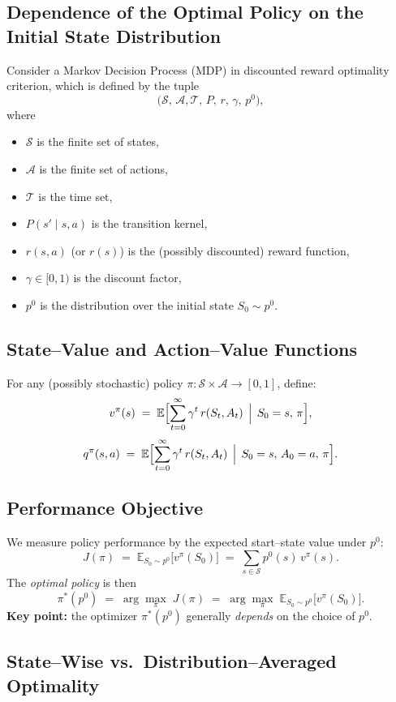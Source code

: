 \subsection{Dependence of the Optimal Policy on the Initial State Distribution}

Consider a Markov Decision Process (MDP) in discounted reward optimality criterion, which is defined by the tuple
\[
\bigl(\mathcal{S},\,\mathcal{A}, \mathcal{T}, \,P,\,r,\,\gamma,\,p^0\bigr),
\]
where
\begin{itemize}
  \item $\mathcal{S}$ is the finite set of states,
  \item $\mathcal{A}$ is the finite set of actions,
  \item $\mathcal{T}$ is the time set,
  \item $P(s' \mid s,a)$ is the transition kernel,
  \item $r(s,a)$ (or $r(s)$) is the (possibly discounted) reward function,
  \item $\gamma\in[0,1)$ is the discount factor,
  \item $p^0$ is the distribution over the initial state $S_0\sim p^0$.
\end{itemize}

\subsection{State–Value and Action–Value Functions}
For any (possibly stochastic) policy $\pi:\mathcal{S}\times\mathcal{A}\to[0,1]$, define:
\[
v^\pi(s) \;=\; \mathbb{E}\Bigl[\sum_{t=0}^\infty \gamma^t\,r(S_t,A_t)\,\Bigm|\,S_0=s,\,\pi\Bigr],
\]
\[
q^\pi(s,a) \;=\; \mathbb{E}\Bigl[\sum_{t=0}^\infty \gamma^t\,r(S_t,A_t)\,\Bigm|\,S_0=s,\,A_0=a,\,\pi\Bigr].
\]

\subsection{Performance Objective}
We measure policy performance by the expected start–state value under $p^0$:
\[
J(\pi)
\;=\;
\mathbb{E}_{S_0\sim p^0}\!\bigl[v^\pi(S_0)\bigr]
\;=\;
\sum_{s\in\mathcal{S}} p^0(s)\,v^\pi(s).
\]
The \emph{optimal policy} is then
\[
\pi^*(p^0)
\;=\;
\arg\max_{\pi}\;J(\pi)
\;=\;
\arg\max_{\pi}\;\mathbb{E}_{S_0\sim p^0}\!\bigl[v^\pi(S_0)\bigr].
\]
\textbf{Key point:} the optimizer $\pi^*(p^0)$ generally \emph{depends} on the choice of $p^0$.

\subsection{State–Wise vs.\ Distribution–Averaged Optimality}

